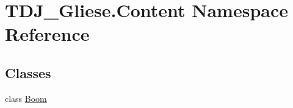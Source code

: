 \hypertarget{namespace_t_d_j___gliese_1_1_content}{}\section{T\+D\+J\+\_\+\+Gliese.\+Content Namespace Reference}
\label{namespace_t_d_j___gliese_1_1_content}
\subsection*{Classes}
\begin{DoxyCompactItemize}
\item 
class \hyperlink{class_t_d_j___gliese_1_1_content_1_1_boom}{Boom}
\end{DoxyCompactItemize}
